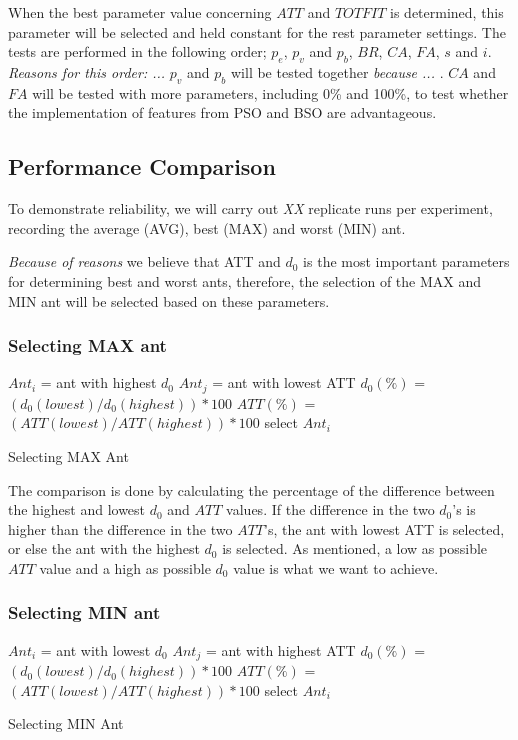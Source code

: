 When the best parameter value concerning $ATT$ and $TOTFIT$ is determined, this parameter will be selected and held constant for the rest parameter settings. The tests are performed in the following order; $p_{e}$, $p_{v}$ and $p_{b}$, $BR$, $CA$, $FA$, $s$ and $i$. \emph{\color{red} Reasons for this order: ... }
$p_{v}$ and $p_{b}$ will be tested together \emph{\color{red}because ... }.
$CA$ and $FA$ will be tested with more parameters, including 0\% and 100\%, to test whether the implementation of features from PSO and BSO are advantageous.

\subsection{Performance Comparison}

To demonstrate reliability, we will carry out \emph{\color{red} XX } replicate runs per experiment, recording the average (AVG), best (MAX) and worst (MIN) ant.  

\emph{\color{red} Because of reasons }we believe that ATT and $d_0$ is the most important parameters for determining best and worst ants, therefore, the selection of the MAX and MIN ant will be selected based on these parameters. 

\subsubsection{Selecting MAX ant}
\begin{algorithm}[H]
$Ant_{i}$ = ant with highest $d_0$\;
$Ant_{j}$ = ant with lowest ATT\;
{
	$d_0(\%)$ = $(d_0(lowest) / d_0(highest))*100$\;
	$ATT(\%)$ = $(ATT(lowest) / ATT(highest))*100$\;
	{
		select $Ant_{i}$
	}
}
 \caption{Selecting MAX Ant}
\end{algorithm}


The comparison is done by calculating the percentage of the difference between the highest and lowest $d_0$ and $ATT$ values. If the difference in the two $d_0$'s is higher than the difference in the two $ATT$'s, the ant with lowest ATT is selected, or else the ant with the highest $d_0$ is selected. As mentioned, a low as possible $ATT$ value and a high as possible $d_0$ value is what we want to achieve.

\subsubsection{Selecting MIN ant}
\begin{algorithm}[H]
$Ant_{i}$ = ant with lowest $d_0$\;
$Ant_{j}$ = ant with highest ATT\;
{
	$d_0(\%)$ = $(d_0(lowest) / d_0(highest))*100$\;
	$ATT(\%)$ = $(ATT(lowest) / ATT(highest))*100$\;
	{
		select $Ant_{i}$
	}
}
 \caption{Selecting MIN Ant}

\end{algorithm}

